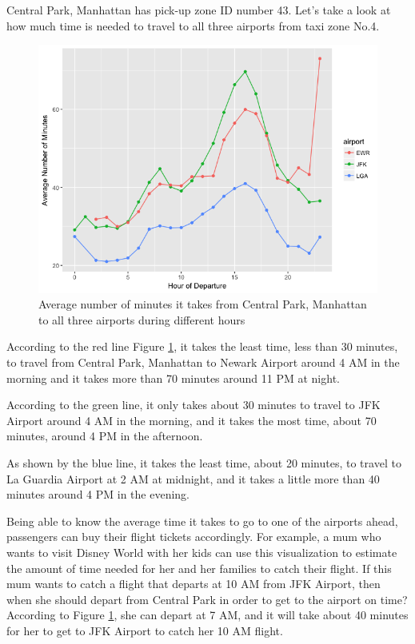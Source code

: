 \documentclass[12pt,twoside]{reedthesis}
\theoremstyle{definition}
\theoremstyle{definition}
\theoremstyle{definition}
\theoremstyle{remark}
\begin{document}
Central Park, Manhattan has pick-up zone ID number 43. Let's take a look
at how much time is needed to travel to all three airports from taxi
zone No.4.
\begin{figure}[h]
\includegraphics[width=5.67in]{figure/airport_vis} \caption{Average number of minutes it takes from Central Park, Manhattan to all three airports during different hours}\label{fig:airport-vis}
\end{figure}
According to the red line Figure \ref{fig:airport-vis}, it takes the
least time, less than 30 minutes, to travel from Central Park, Manhattan
to Newark Airport around 4 AM in the morning and it takes more than 70
minutes around 11 PM at night.

According to the green line, it only takes about 30 minutes to travel to
JFK Airport around 4 AM in the morning, and it takes the most time,
about 70 minutes, around 4 PM in the afternoon.

As shown by the blue line, it takes the least time, about 20 minutes, to
travel to La Guardia Airport at 2 AM at midnight, and it takes a little
more than 40 minutes around 4 PM in the evening.

Being able to know the average time it takes to go to one of the
airports ahead, passengers can buy their flight tickets accordingly. For
example, a mum who wants to visit Disney World with her kids can use
this visualization to estimate the amount of time needed for her and her
families to catch their flight. If this mum wants to catch a flight that
departs at 10 AM from JFK Airport, then when she should depart from
Central Park in order to get to the airport on time? According to Figure
\ref{fig:airport-vis}, she can depart at 7 AM, and it will take about 40
minutes for her to get to JFK Airport to catch her 10 AM flight.
\end{document}
